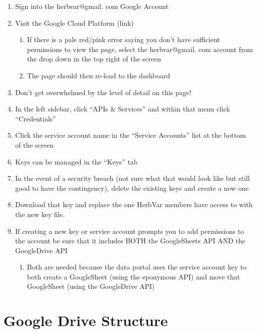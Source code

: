 \documentclass[
  letterpaper,
  DIV=11,
  numbers=noendperiod]{scrreprt}
\providecommand{\tightlist}{%
  \setlength{\itemsep}{0pt}\setlength{\parskip}{0pt}}\usepackage{longtable,booktabs,array}
\begin{document}
\begin{enumerate}
\def\labelenumi{\arabic{enumi}.}
\item
  Sign into the herbvar@gmail. com Google Account
\item
  Visit the Google Cloud Platform (link)

  \begin{enumerate}
  \def\labelenumii{\alph{enumii}.}
  \item
    If there is a pale red/pink error saying you don't have sufficient
    permissions to view the page, select the herbvar@gmail. com account
    from the drop down in the top right of the screen
  \item
    The page should then re-load to the dashboard
  \end{enumerate}
\item
  Don't get overwhelmed by the level of detail on this page!
\item
  In the left sidebar, click ``APIs \& Services'' and within that menu
  click ``Credentials''
\item
  Click the service account name in the ``Service Accounts'' list at the
  bottom of the screen
\item
  Keys can be managed in the ``Keys'' tab
\item
  In the event of a security breach (not sure what that would look like
  but still good to have the contingency), delete the existing keys and
  create a new one
\item
  Download that key and replace the one HerbVar members have access to
  with the new key file.
\item
  If creating a new key or service account prompts you to add
  permissions to the account be sure that it includes BOTH the
  GoogleSheets API AND the GoogleDrive API

  \begin{enumerate}
  \def\labelenumii{\alph{enumii}.}
  \tightlist
  \item
    Both are needed because the data portal uses the service account key
    to both create a GoogleSheet (using the eponymous API) and move that
    GoogleSheet (using the GoogleDrive API)
  \end{enumerate}
\end{enumerate}

\chapter{Google Drive Structure}\label{google-drive-structure}
\end{document}
